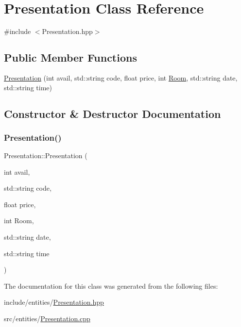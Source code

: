 \hypertarget{class_presentation}{}\section{Presentation Class Reference}
\label{class_presentation}


{\ttfamily \#include $<$Presentation.\+hpp$>$}

\subsection*{Public Member Functions}
\begin{DoxyCompactItemize}
\item 
\mbox{\hyperlink{class_presentation_ab5683bbdb1997e6d196fbd9d18b0d9b0}{Presentation}} (int avail, std\+::string code, float price, int \mbox{\hyperlink{class_room}{Room}}, std\+::string date, std\+::string time)
\end{DoxyCompactItemize}


\subsection{Constructor \& Destructor Documentation}
\mbox{\label{class_presentation_ab5683bbdb1997e6d196fbd9d18b0d9b0}} 
\subsubsection{\texorpdfstring{Presentation()}{Presentation()}}
{\footnotesize\ttfamily Presentation\+::\+Presentation (\begin{DoxyParamCaption}\item[{int}]{avail,  }\item[{std\+::string}]{code,  }\item[{float}]{price,  }\item[{int}]{Room,  }\item[{std\+::string}]{date,  }\item[{std\+::string}]{time }\end{DoxyParamCaption})}



The documentation for this class was generated from the following files\+:\begin{DoxyCompactItemize}
\item 
include/entities/\mbox{\hyperlink{_presentation_8hpp}{Presentation.\+hpp}}\item 
src/entities/\mbox{\hyperlink{_presentation_8cpp}{Presentation.\+cpp}}\end{DoxyCompactItemize}

